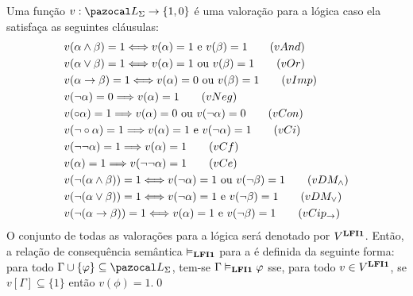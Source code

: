         \begin{definicao} \label{def:valoracoes}
            Uma função $v : \ling{} \to \{1, 0\}$ é uma valoração para a lógica \lfium{} caso ela satisfaça as seguintes cláusulas:
            \begin{align*}
                & v(\alpha \land \beta) = 1 \Longleftrightarrow v(\alpha) = 1 \text{ e } v(\beta) = 1\tag{\textbf{$vAnd$}}\\
                & v(\alpha \lor \beta) = 1 \Longleftrightarrow v(\alpha) = 1 \text{ ou } v(\beta) = 1\tag{\textbf{$vOr$}}\\
                & v(\alpha \to \beta) = 1 \Longleftrightarrow v(\alpha) = 0 \text{ ou } v(\beta) = 1\tag{\textbf{$vImp$}}\\
                & v(\neg \alpha) = 0 \Longrightarrow v(\alpha) = 1\tag{\textbf{$vNeg$}}\\
                & v(\circ \alpha) = 1 \Longrightarrow v(\alpha) = 0 \text{ ou } v(\neg \alpha) = 0\tag{\textbf{$vCon$}}\\
                & v(\neg \circ \alpha) = 1 \Longrightarrow v(\alpha) = 1 \text{ e } v(\neg \alpha) = 1\tag{\textbf{$vCi$}}\\
                & v(\neg \neg \alpha) = 1 \Longrightarrow v(\alpha) = 1\tag{\textbf{$vCf$}}\\
                & v(\alpha) = 1 \Longrightarrow v(\neg \neg \alpha) = 1\tag{\textbf{$vCe$}}\\
                & v(\neg (\alpha \land \beta)) = 1 \Longleftrightarrow v(\neg \alpha) = 1 \text{ ou } v(\neg \beta) = 1\tag{\textbf{$vDM_{\land}$}}\\
                & v(\neg (\alpha \lor \beta)) = 1 \Longleftrightarrow v(\neg \alpha) = 1 \text{ e } v(\neg \beta) = 1\tag{\textbf{$vDM_{\lor}$}}\\
                & v(\neg (\alpha \to \beta)) = 1 \Longleftrightarrow v(\alpha) = 1 \text{ e } v(\neg \beta) = 1\tag{\textbf{$vCip_{\to}$}}
            \end{align*}
            O conjunto de todas as valorações para a lógica \lfium{} será denotado por $V^{{\normalfont\textbf{LFI1}}{}}$. Então, a relação de consequência semântica $\vDash_{{\normalfont\textbf{LFI1}}{}}$ para a \lfium{} é definida da seguinte forma: para todo $\Gamma \cup \{\phi\} \subseteq \ling{}$, tem-se $\Gamma \vDash_{{\normalfont\textbf{LFI1}}{}} \varphi$ sse, para todo $v \in V^{{\normalfont\textbf{LFI1}}{}}$, se $v[\Gamma] \subseteq \{1\}$ então $v(\phi) = 1$.\qed{}
        \end{definicao}


